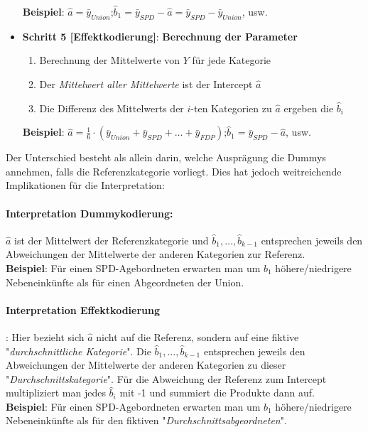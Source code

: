 \documentclass[a4paper]{article}
\begin{document}
\begin{itemize}
            \textbf{Beispiel}: $\hat a = \bar y_{Union}$;\quad $\hat b_1 = \bar y_{SPD} - \hat a = \bar y_{SPD} - \bar y_{Union}$, usw.
    \item[] \textbf{Schritt 5 [Effektkodierung]}: \textbf{Berechnung der Parameter}
            \begin{enumerate}
                \item Berechnung der Mittelwerte von $Y$ für jede Kategorie
                \item Der \textit{Mittelwert aller Mittelwerte} ist der Intercept $\hat a$
                \item Die Differenz des Mittelwerts der $i$-ten Kategorien zu $\hat a$ ergeben die $\hat b_i$
            \end{enumerate}
            \textbf{Beispiel}: $\hat a = \frac{1}{6}\cdot(\bar y_{Union} + \bar y_{SPD} + \hdots + \bar y_{FDP})$;\quad $\hat b_1 = \bar y_{SPD} - \hat a$, usw.
\end{itemize}

\noindent Der Unterschied besteht als allein darin, welche Ausprägung die Dummys annehmen, falls die Referenzkategorie vorliegt. Dies hat jedoch weitreichende Implikationen für die Interpretation:

\paragraph{Interpretation Dummykodierung:}
$\hat{a}$ ist der Mittelwert der Referenzkategorie und $\hat{b}_1, \hdots, \hat{b}_{k-1}$ entsprechen jeweils den Abweichungen der Mittelwerte der anderen Kategorien zur Referenz.\\ 
\textbf{Beispiel}: Für einen SPD-Agebordneten erwarten man um $\hat{b}_1$ höhere/niedrigere Nebeneinkünfte als für einen Abgeordneten der Union.

\paragraph{Interpretation Effektkodierung}: Hier bezieht sich $\hat a$ nicht auf die Referenz, sondern auf eine fiktive "\textit{durchschnittliche Kategorie}". Die $\hat{b}_1, \hdots, \hat{b}_{k-1}$ entsprechen jeweils den Abweichungen der Mittelwerte der anderen Kategorien zu dieser "\textit{Durchschnittskategorie}". Für die Abweichung der Referenz zum Intercept multipliziert man jedes $\hat b_i$ mit -1 und summiert die Produkte dann auf.\\ 
\textbf{Beispiel}: Für einen SPD-Agebordneten erwarten man um $\hat{b}_1$ höhere/niedrigere Nebeneinkünfte als für den fiktiven "\textit{Durchschnittsabgeordneten}".
\end{document}
